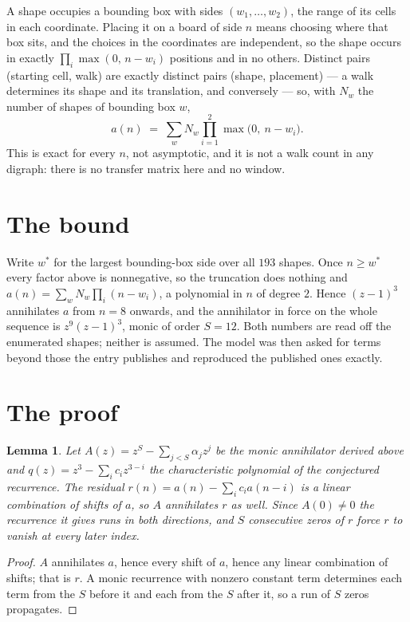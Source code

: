 \documentclass[11pt,a4paper]{article}
\theoremstyle{plain}
\newtheorem{lemma}[theorem]{Lemma}
\theoremstyle{definition}
\begin{document}
A shape occupies a bounding box with sides $(w_1,\dots,w_{2})$, the range of its cells in each
coordinate. Placing it on a board of side $n$ means choosing where that box sits, and the
choices in the coordinates are independent, so the shape occurs in exactly
$\prod_{i}\max(0,\,n-w_i)$ positions and in no others. Distinct pairs (starting cell,
walk) are exactly distinct pairs (shape, placement) --- a walk determines its shape and its
translation, and conversely --- so, with $N_w$ the number of shapes of bounding box $w$,
\[
a(n)\;=\;\sum_{w} N_w \prod_{i=1}^{2}\max\bigl(0,\ n-w_i\bigr).
\]
This is exact for every $n$, not asymptotic, and it is not a walk count in any digraph: there is
no transfer matrix here and no window.

\section{The bound}

Write $w^\ast$ for the largest bounding-box side over all $193$ shapes. Once $n\ge w^\ast$
every factor above is nonnegative, so the truncation does nothing and
$a(n)=\sum_w N_w\prod_i(n-w_i)$, a polynomial in $n$ of degree $2$. Hence $(z-1)^{3}$
annihilates $a$ from $n=8$ onwards, and the annihilator in force on the whole sequence is
$z^{9}(z-1)^{3}$, monic of order $S=12$. Both numbers are read off the enumerated
shapes; neither is assumed. The model was then asked for terms beyond those the entry publishes
and reproduced the published ones exactly.

\section{The proof}

\begin{lemma}\label{lem:crit}
Let $A(z)=z^S-\sum_{j<S}\alpha_jz^{j}$ be the monic annihilator derived above and
$q(z)=z^{3}-\sum_ic_iz^{3-i}$ the characteristic polynomial of the conjectured
recurrence. The residual $r(n)=a(n)-\sum_ic_ia(n-i)$ is a linear combination of shifts of $a$,
so $A$ annihilates $r$ as well. Since $A(0)\ne0$ the recurrence it gives runs in both
directions, and $S$ consecutive zeros of $r$ force $r$ to vanish at every later index.
\end{lemma}

\begin{proof}
$A$ annihilates $a$, hence every shift of $a$, hence any linear combination of shifts; that is
$r$. A monic recurrence with nonzero constant term determines each term from the $S$ before it
and each from the $S$ after it, so a run of $S$ zeros propagates.
\end{proof}
\end{document}
